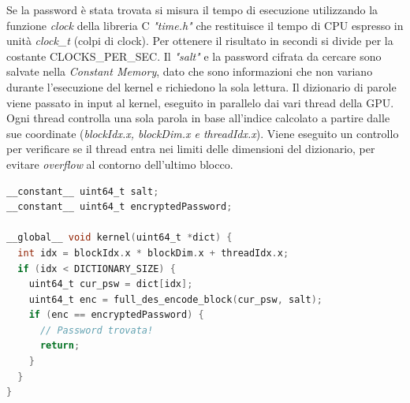 \documentclass[10pt,twocolumn,letterpaper]{article}
\begin{document}
Se la password è stata trovata si misura il tempo di esecuzione utilizzando la funzione \textit{clock} della libreria C \textit{"time.h"} che restituisce il tempo di CPU espresso in unità \textit{clock\_t} (colpi di clock). Per ottenere il risultato in secondi si divide per la costante CLOCKS\_PER\_SEC.\newline
Il \textit{"salt"} e la password cifrata da cercare sono salvate nella \textit{Constant Memory}, dato che sono informazioni che non variano durante l'esecuzione del kernel e richiedono la sola lettura.\newline
Il dizionario di parole viene passato in input al kernel, eseguito in parallelo dai vari thread della GPU. Ogni thread controlla una sola parola in base all'indice calcolato a partire dalle sue coordinate (\textit{blockIdx.x, blockDim.x e threadIdx.x}). Viene eseguito un controllo per verificare se il thread entra nei limiti delle dimensioni del dizionario, per evitare \textit{overflow} al contorno dell'ultimo blocco.  
\newline
\begin{lstlisting}[basicstyle=\scriptsize, language=C, frame=single, caption={Esempio di kernel in CUDA},captionpos=b]
__constant__ uint64_t salt;
__constant__ uint64_t encryptedPassword;

__global__ void kernel(uint64_t *dict) {
  int idx = blockIdx.x * blockDim.x + threadIdx.x;
  if (idx < DICTIONARY_SIZE) {
    uint64_t cur_psw = dict[idx];
    uint64_t enc = full_des_encode_block(cur_psw, salt);
    if (enc == encryptedPassword) {
      // Password trovata!
      return;
    }
  }
}
\end{lstlisting}
\end{document}
